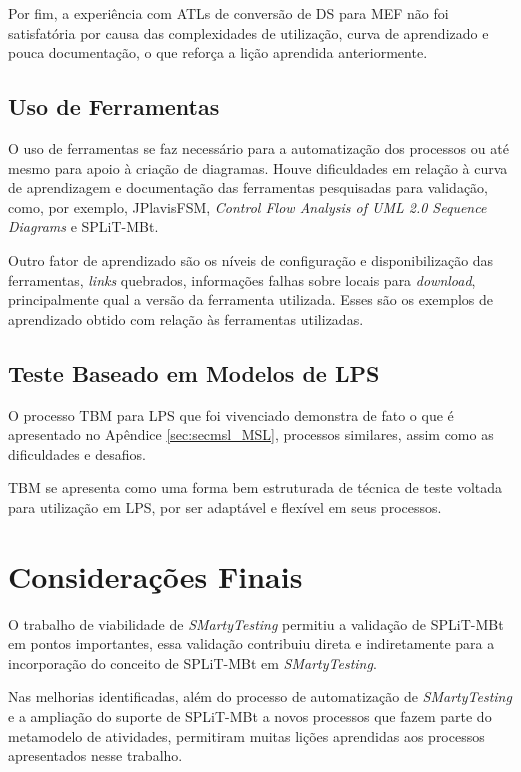 Por fim, a experiência com ATLs de conversão de DS para MEF não foi satisfatória por causa das complexidades de utilização, curva de aprendizado e pouca documentação, o que reforça a lição aprendida anteriormente.

\subsection{Uso de Ferramentas}
O uso de ferramentas se faz necessário para a automatização dos processos ou até mesmo para apoio à criação de diagramas. Houve dificuldades em relação à curva de aprendizagem e documentação das ferramentas pesquisadas para validação, como, por exemplo, JPlavisFSM, \textit{Control Flow Analysis of UML 2.0 Sequence Diagrams} e SPLiT-MBt.

Outro fator de aprendizado são os níveis de configuração e disponibilização das ferramentas, \textit{links} quebrados, informações falhas sobre locais para \textit{download}, principalmente qual a versão da ferramenta utilizada. Esses são os exemplos de aprendizado obtido com relação às ferramentas utilizadas. 
\subsection{Teste Baseado em Modelos de LPS}
O processo TBM para LPS que foi vivenciado demonstra de fato o que é apresentado no Apêndice \ref{sec:secmsl_MSL}, processos similares, assim como as dificuldades e desafios. 

TBM se apresenta como uma forma bem estruturada de técnica de teste voltada para utilização em LPS, por ser adaptável e flexível em seus processos.

\section{Considerações Finais}
O trabalho de viabilidade de \textit{SMartyTesting} permitiu a validação de SPLiT-MBt em pontos importantes, essa validação contribuiu direta e indiretamente para a incorporação do conceito de SPLiT-MBt em \textit{SMartyTesting}.

Nas melhorias identificadas, além do processo de automatização de \textit{SMartyTesting} e a ampliação do suporte de SPLiT-MBt a novos processos que fazem parte do metamodelo de atividades, permitiram muitas lições aprendidas aos processos apresentados nesse trabalho.

